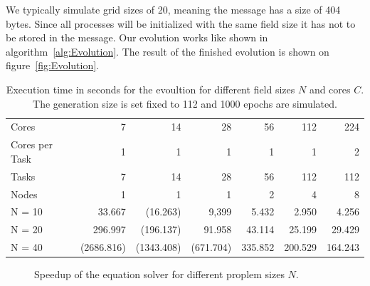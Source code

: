 \documentclass[12pt]{article}
\begin{document}
We typically simulate grid sizes of 20, meaning the message has a size of 404 bytes. Since all processes will be initialized with the same field size it has not to be stored in the message. Our evolution works like shown in algorithm~\ref{alg:Evolution}. The result of the finished evolution is shown on figure~\ref{fig:Evolution}.


\begin{table}[p]
    \centering
    \begin{tabular}{lrrrrrr}
        \toprule
        Cores & 7 & 14 & 28 & 56 & 112 & 224 \\
        Cores per Task & 1 & 1 & 1 & 1 & 1 & 2 \\
        Tasks & 7 & 14 & 28 & 56 & 112 & 112 \\
        Nodes & 1 & 1 & 1 & 2 & 4 & 8 \\
        \midrule
        N = 10 & 33.667     & (16.263) & 9,399 & 5.432 & 2.950 & 4.256 \\
        N = 20 & 296.997    & (196.137) & 91.958 & 43.114 & 25.199 & 29.429 \\
        N = 40 & (2686.816)          & (1343.408) & (671.704) & 335.852 & 200.529 & 164.243 \\
        \bottomrule
    \end{tabular}
    \caption{Execution time in seconds for the evoultion for different field sizes $N$ and cores $C$. The generation size is set fixed to 112 and 1000 epochs are simulated.}
    \label{tab:Speedup}
\end{table}

\begin{figure}[p]
    \centering
    
    \caption{Speedup of the equation solver for different proplem sizes $N$.}
    \label{fig:Speedup}
\end{figure}


\clearpage
\end{document}
